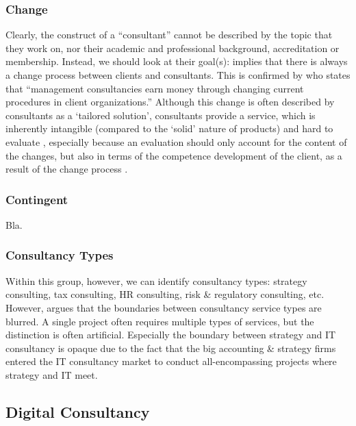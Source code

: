 \documentclass[12pt]{article}
\begin{document}
\hypertarget{change}{%
\subsubsection{Change}\label{change}}

Clearly, the construct of a ``consultant'' cannot be described by the
topic that they work on, nor their academic and professional background,
accreditation or membership. Instead, we should look at their goal(s):
\citet[1]{werr1986} implies that there is always a change process
between clients and consultants. This is confirmed by
\citet[12]{kipping2000} who states that ``management consultancies earn
money through changing current procedures in client organizations.''
Although this change is often described by consultants as a `tailored
solution', consultants provide a service, which is inherently intangible
(compared to the `solid' nature of products) and hard to evaluate
\citep[ 348]{fincham1999}, especially because an evaluation should only
account for the content of the changes, but also in terms of the
competence development of the client, as a result of the change process
\citep[ 17]{werr1986}.

\hypertarget{contingent}{%
\subsubsection{Contingent}\label{contingent}}

Bla.

\hypertarget{consultancy-types}{%
\subsubsection{Consultancy Types}\label{consultancy-types}}

Within this group, however, we can identify consultancy types: strategy
consulting, tax consulting, HR consulting, risk \& regulatory
consulting, etc. However, \citet[71-72]{armbruster2006} argues that the
boundaries between consultancy service types are blurred. A single
project often requires multiple types of services, but the distinction
is often artificial. Especially the boundary between strategy and IT
consultancy is opaque due to the fact that the big accounting \&
strategy firms entered the IT consultancy market to conduct
all-encompassing projects where strategy and IT meet.

\hypertarget{digital-consultancy}{%
\subsection{Digital Consultancy}\label{digital-consultancy}}
\end{document}
